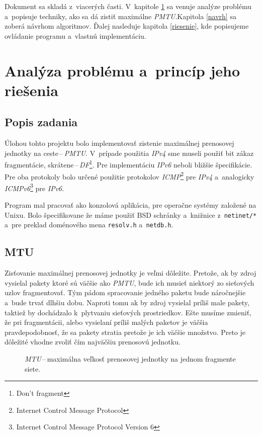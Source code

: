 \documentclass[12pt,a4paper,titlepage]{article}
\begin{document}
    Dokument sa skladá z~viacerých časti. V~kapitole \ref{analyza} 
    sa venuje analýze problému a~popisuje techniky, ako sa dá
    zistiť maximálne \emph{PMTU}.Kapitola \ref{navrh} sa zoberá návrhom algoritmov.
    Ďalej nasleduje kapitola \ref{riesenie}, kde popisujeme ovládanie
    programu a~vlastnú implementáciu.

\section{Analýza problému a~princíp jeho riešenia} \label{analyza} 
    \subsection{Popis zadania}
    Úlohou tohto projektu bolo implementovať zistenie maximálnej
    prenosovej jednotky na ceste\,--\,\emph{PMTU}. V~prípade použitia \emph{IPv4}
    sme museli použiť bit zákaz fragmentácie, 
    skrátene\,--\,\emph{DF}\footnote{Don't fragment}. Pre implementáciu
    \emph{IPv6} neboli bližšie špecifikácie. Pre oba protokoly bolo
    určené použitie protokolov \emph{ICMP}\footnote{Internet Control
    Message Protocol} pre \emph{IPv4} a~analogicky \emph{ICMPv6}\footnote{Internet
    Control Message Protocol Version 6} pre \emph{IPv6}.

    Program mal pracovať ako konzolová aplikácia,
    pre operačne systémy založené na Unixu. Bolo špecifikovane 
    že máme použiť BSD schránky a~knižnice z~\texttt{netinet/*}
    a~pre preklad doménového mena \texttt{resolv.h} a~\texttt{netdb.h}.

    \subsection{MTU}
        Zisťovanie maximálnej prenosovej jednotky je veľmi dôležite.
        Pretože, ak by zdroj vysielal pakety ktoré sú väčšie ako 
        \emph{PMTU}, bude ich musieť niektorý zo sieťových uzlov fragmentovať.
        Tým pádom spracovanie jedného paketu bude náročnejšie a~bude trvať dlhšiu dobu.
        Naproti tomu ak by zdroj vysielal príliš male pakety, taktiež by dochádzalo
k~plytvaniu sieťových prostriedkov. Ešte musíme zmieniť, že pri
        fragmentácii, alebo vysielaní príliš malých paketov je väčšia pravdepodobnosť, že sa 
        pakety stratia pretože je ich väčšie množstvo.
        Preto je dôležité vhodne zvoliť čím najväčšiu prenosovú jednotku.

        \begin{figure}[htb!]
            \begin{center}
                \caption{\emph{MTU}\,--\,maximálna veľkosť prenosovej jednotky na jednom fragmente siete.}
                \label{mtu}
            \end{center}
       \end{figure}
\end{document}
